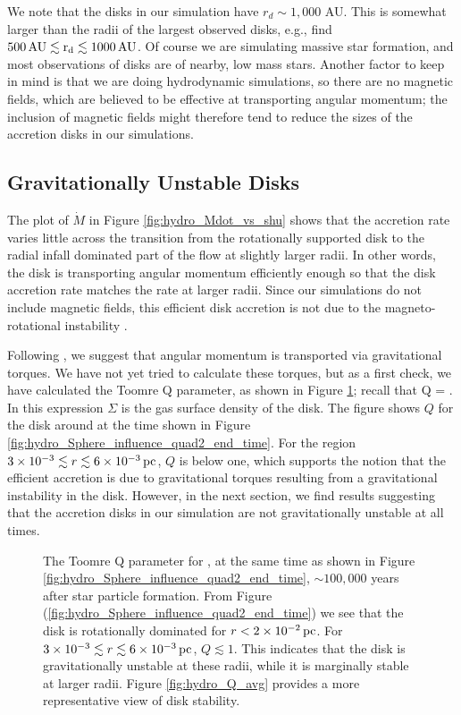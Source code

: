 \documentclass[../dissertation.tex]{subfiles}
\begin{document}
We note that the disks in our simulation have $r_d\sim 1,000$ AU. 
This is somewhat larger than the radii of the largest observed disks, e.g., \citet{1999AJ....117.1490P} find
$500\,\rm AU\lesssim r_d\lesssim 1000\,\rm AU$. Of course we are simulating massive
star formation, and most observations of disks are of nearby, low mass stars. Another
factor to keep in mind is that we are doing hydrodynamic simulations, so there are
no magnetic fields, which are believed to be effective at transporting angular momentum; 
the inclusion of magnetic fields might therefore tend to reduce the sizes of the accretion
disks in our simulations. 

\subsection{Gravitationally Unstable Disks}

The plot of $\dot{M}$ in Figure \ref{fig:hydro_Mdot_vs_shu} shows that the accretion rate varies little across the transition from the rotationally supported disk to the 
radial infall dominated part of the flow at slightly larger radii. In other 
words, the disk is transporting angular momentum efficiently enough so that 
the disk accretion rate matches the rate at larger radii. Since our simulations 
do not include magnetic fields, this efficient disk accretion is not due to the magneto-rotational instability \citep{1991ApJ...376..214B,1998RvMP...70....1B}.

Following \citet{2010ApJ...708.1585K}, we suggest that angular momentum is transported via gravitational torques. We have not yet
tried to calculate these torques, but as a first check, we have calculated the 
Toomre Q parameter, as shown in Figure \ref{fig:hydro_Toomre_Q_2B}; recall that 
%
\be 
Q = .
\label{eq:hydro_Toomre_Q}
\ee
%
In this expression $\Sigma$ is the gas surface density of the disk.
The figure shows $Q$ for the disk around \partB at the time shown in Figure
\ref{fig:hydro_Sphere_influence_quad2_end_time}.
For the region $3\times10^{-3} \lesssim r \lesssim 6\times10^{-3} \,\rm pc$, $Q$ 
is below one, which supports the notion that the efficient accretion 
is due to gravitational torques resulting from a gravitational instability 
in the disk. However, in the next section, we find results suggesting that
the accretion disks in our simulation are not gravitationally unstable at all
times.
%
\begin{figure}[htb] %
\caption[Hydro Toomre Q]{\label{fig:hydro_Toomre_Q_2B}The Toomre Q parameter for \partB, at the same time as shown in
Figure \ref{fig:hydro_Sphere_influence_quad2_end_time}, $\sim 100,000$ years 
after star particle formation. From Figure 
(\ref{fig:hydro_Sphere_influence_quad2_end_time}) we see that the disk is rotationally
dominated for $r<2\times10^{-2}\,\rm pc$. 
For $3\times10^{-3} \lesssim r \lesssim 6\times10^{-3} \,\rm pc$, $Q\lesssim 1$. 
This indicates that the disk is gravitationally unstable at these radii, 
while it is marginally stable at larger radii.
Figure \ref{fig:hydro_Q_avg} provides a more representative view of disk stability.}
\end{figure}
\end{document}

